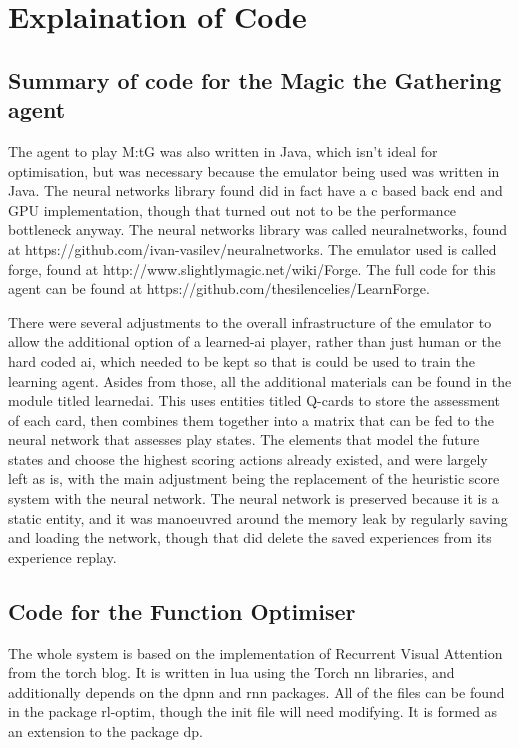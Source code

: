 \appendix
{}



\section{Explaination of Code}

\subsection{Summary of code for the Magic the Gathering agent}
The agent to play M:tG was also written in Java, which isn't ideal for optimisation, but was necessary because the emulator being used was written in Java. The neural networks library found did in fact have a c based back end and GPU implementation, though that turned out not to be the performance bottleneck anyway. The neural networks library was called neuralnetworks, found at https://github.com/ivan-vasilev/neuralnetworks. The emulator used is called forge, found at http://www.slightlymagic.net/wiki/Forge. The full code for this agent can be found at https://github.com/thesilencelies/LearnForge. 

There were several adjustments to the overall infrastructure of the emulator to allow the additional option of a learned-ai player, rather than just human or the hard coded ai, which needed to be kept so that is could be used to train the learning agent. Asides from those, all the additional materials can be found in the module titled learnedai. This uses entities titled Q-cards to store the assessment of each card, then combines them together into a matrix that can be fed to the neural network that assesses play states. The elements that model the future states and choose the highest scoring actions already existed, and were largely left as is, with the main adjustment being the replacement of the heuristic score system with the neural network.
The neural network is preserved because it is a static entity, and it was manoeuvred around the memory leak by regularly saving and loading the network, though that did delete the saved experiences from its experience replay.

\subsection{Code for the Function Optimiser}
The whole system is based on the implementation of Recurrent Visual Attention from the torch blog\cite{Torch:RVA}. It is written in lua using the Torch nn libraries, and additionally depends on the dpnn and rnn packages. All of the files can be found in the package rl-optim, though the init file will need modifying. It is formed as an extension to the package dp.

